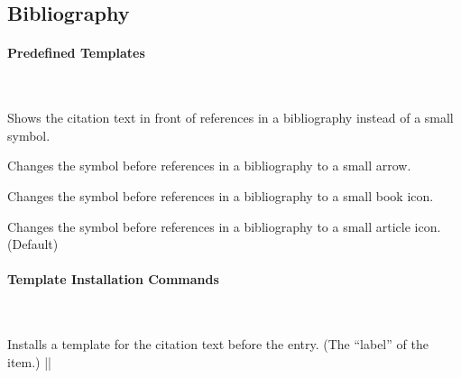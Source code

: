 





\subsection{Bibliography}

\label{section-bib-templates}

\paragraph{Predefined Templates}\

\begin{command}{\beamertemplatetextbibitems}
  Shows the citation text in front of references in a
  bibliography instead of a small symbol.
\end{command} 

\begin{command}{\beamertemplatearrowbibitems}
  Changes the symbol before references in a bibliography to
  a small arrow.
\end{command}

\begin{command}{\beamertemplatebookbibitems}
  Changes the symbol before references in a bibliography to
  a small book icon.
\end{command}

\begin{command}{\beamertemplatearticlebibitems}
  Changes the symbol before references in a bibliography to
  a small article icon. (Default)
\end{command}



\paragraph{Template Installation Commands}\ 

\begin{command}{\usebibitemtemplate{}}
  Installs a template for the citation text before the entry. (The 
  ``label'' of the item.)
  \example |\usebibitemtemplate{\color{structure}\insertbiblabel}|
\end{command}


